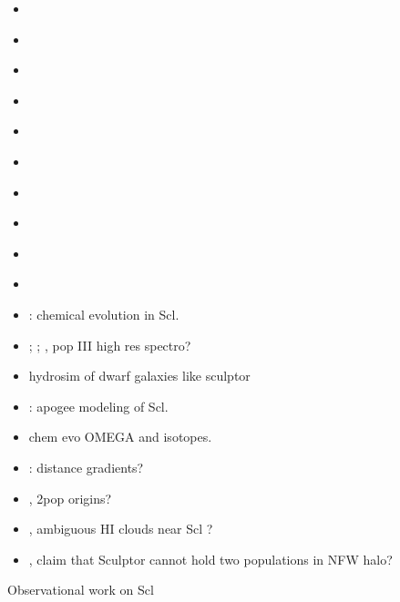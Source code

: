 \begin{itemize}
\tightlist
\item
  \citet{battaglia+2008}
\item
  \citet{iorio+2019}
\item
  \citet{amorisco+zavala+deboer2014}
\item
  \citet{battaglia+2008}
\item
  \citet{breddels+2013}
\item
  \citet{breddels+helmi2013}
\item
  \citet{richardson+fairbairn2014}
\item
  \citet{SFW2017}
\item
  \citet{innanen+papp1979}
\item
  \citet{wilkinson+2002}
\item
  \citet{yang+2025}: chemical evolution in Scl.
\item
  \citet{skuladottir+2024}; \citet{skuladottir+2021};
  \citet{lee+jeon+bromm2024}, pop III high res spectro?
\item
  \citet{wang+2024a} hydrosim of dwarf galaxies like sculptor
\item
  \citet{tang+2023}: apogee modeling of Scl.
\item
  \citet{pandey+west2022} chem evo OMEGA and isotopes.
\item
  \citet{an+koposov2022}: distance gradients?
\item
  \citet{kawata+2006}, 2pop origins?
\item
  \citet{grcevich+putman2009}, \citet{carignan+1998} ambiguous HI clouds
  near Scl ?
\item
  \citet{agnello+evans2012}, claim that Sculptor cannot hold two
  populations in NFW halo?
\end{itemize}

Observational work on Scl

